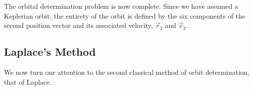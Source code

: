 \documentclass[11pt,twoside,letterpaper]{article}
\begin{document}
  The orbital determination problem is now complete. Since we have
  assumed a Keplerian orbit, the entirety of the orbit is defined by
  the six components of the second position vector and its associated
  velocity, $\vec{r}_2$ and $\vec{v}_2$.

  \subsection{Laplace's Method}
  We now turn our attention to the second classical method of orbit
  determination, that of Laplace. 

  {}
  
\end{document}
